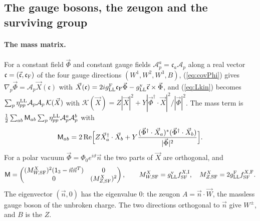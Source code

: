 \documentclass[aps,prd,onecolumn,superscriptaddress,nofootinbib,floatfix,longbibliography]{revtex4-2}
\newcommand{\LL}{{\rm LL}}
\newcommand{\SF}{{\rm SF}}
\begin{document}
\subsection{The gauge bosons, the zeugon and the surviving group}
\label{sec:mass}

\paragraph*{The mass matrix.}
For a constant field $\vec\Phi$ and constant gauge fields $\mathcal A^a_p=\mathfrak c_a\mathcal A_p$ along a real vector
$\mathfrak c=(\vec{\mathfrak c},\mathfrak c_{\rm F})$ of the four gauge directions $(W^1,W^2,W^3,B)$, (\ref{eq:covPhi}) gives
$\nabla_p\vec\Phi=\mathcal A_p\vec X(\mathfrak c)$ with $\vec X(\mathfrak c)=2ig^{\rm F}_\LL\mathfrak c_{\rm F}\vec\Phi-g^{\rm v}_\LL\vec{\mathfrak c}\times\vec\Phi$, and
(\ref{eq:Lkin}) becomes $\sum_p\eta^\LL_{pp}\mathcal A_p\mathcal A_p\,\mathcal K(\vec X)$ with
$\mathcal K(\vec X)=Z|\vec X|^2+Y|\vec\Phi^\dagger\cdot\vec X|^2/|\vec\Phi|^2$. The mass term is
$\frac12\sum_{ab}\mathsf M_{ab}\sum_p\eta^\LL_{pp}\mathcal A^a_p\mathcal A^b_p$ with
\begin{equation}
\mathsf M_{ab}=2\,{\rm Re}\Big[Z\vec X_a^\dagger\cdot\vec X_b+Y\frac{(\vec\Phi^\dagger\cdot\vec X_a)^*(\vec\Phi^\dagger\cdot\vec X_b)}{|\vec\Phi|^2}\Big].
\label{eq:massmatrix}
\end{equation}
For a polar vacuum $\vec\Phi=\Phi_0e^{i\vartheta}\vec n$ the two parts of $\vec X$ are orthogonal, and
\begin{equation}
\mathsf M=\begin{pmatrix}(M^X_{W,\SF})^2(\mathsf 1_3-\vec n\vec n^T)&0\\0&(M^X_{Z,\SF})^2\end{pmatrix},\qquad
M^X_{W,\SF}=g^{\rm v}_\LL f^{X,{\rm I}}_\SF,\quad M^X_{Z,\SF}=2g^{\rm F}_\LL f^{X,{\rm F}}_\SF .
\label{eq:MWMZ}
\end{equation}
The eigenvector $(\vec n,0)$ has the eigenvalue 0: the zeugon $A=\vec n\cdot\vec W$, the massless gauge boson of the unbroken charge. The two directions orthogonal to $\vec n$ give
$W^\pm$, and $B$ is the $Z$.
\end{document}
